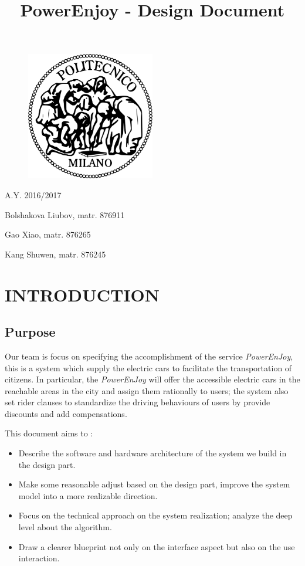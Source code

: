 \documentclass[a4paper,11pt]{article}
\title{PowerEnjoy - Design Document}
\begin{document}
\begin{titlepage}
\begin{figure}
	\centering
	\includegraphics[width=0.5\textwidth]{images/polimi}
\end{figure}
\maketitle
\centering
A.Y. 2016/2017

Bolshakova Liubov, matr. 876911 

Gao Xiao, matr. 876265 

Kang Shuwen, matr. 876245

\end{titlepage}

\tableofcontents
\newpage
	
\section{INTRODUCTION}
	\subsection{Purpose}
	 Our team is focus on specifying the accomplishment of the service \textsl{PowerEnJoy}, this is a system which supply the electric cars to facilitate the transportation of citizens. In particular, the \textsl{PowerEnJoy} will offer the accessible electric cars in the reachable areas in the city and assign them rationally to users; the system also set rider clauses to standardize the driving behaviours of users by provide discounts and add compensations.
	 
	 This document aims to :
	 \begin{itemize}
	 \item Describe the software and hardware architecture of the system we build in the design part.
	 \item Make some reasonable adjust based on the design part, improve the system model into a more realizable direction.
	 \item Focus on the technical approach on the system realization; analyze the deep level about the algorithm.
	 \item Draw a clearer blueprint not only on the interface aspect but also on the use interaction.
	 \end{itemize}
	 
\end{document}

